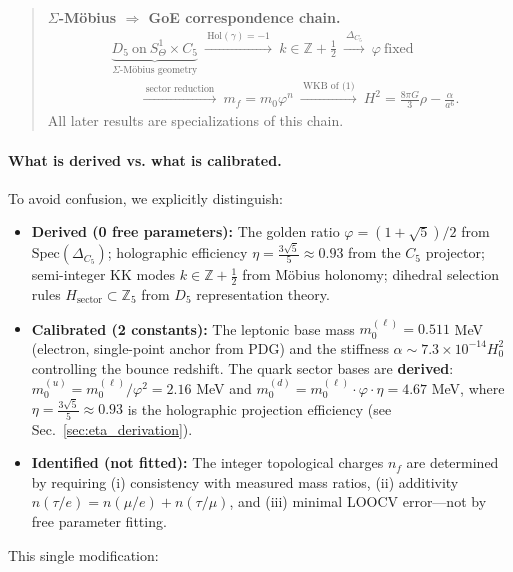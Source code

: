 \documentclass[12pt]{article}
\theoremstyle{definition}
\theoremstyle{plain}
\begin{document}
\begin{quote}
\textbf{$\Sigma$-M\"obius $\Rightarrow$ GoE correspondence chain.}
\begin{align*}
&\underbrace{D_5\ \text{on}\ S^1_\Theta \times C_5}_{\text{$\Sigma$-M\"obius geometry}}
\ \xrightarrow{\ \text{Hol}(\gamma)=-1\ }\ 
k \in \mathbb{Z}+\tfrac{1}{2}
\ \xrightarrow{\ \Delta_{C_5}\ }\ 
\varphi\ \text{fixed} \\
&\qquad \xrightarrow{\ \text{sector reduction}\ }\ 
m_f=m_0\varphi^n
\ \xrightarrow{\ \text{WKB of (1)}\ }\ 
H^2=\tfrac{8\pi G}{3}\rho-\tfrac{\alpha}{a^6}.
\end{align*}
All later results are specializations of this chain.
\end{quote}

\paragraph{What is derived vs. what is calibrated.}
To avoid confusion, we explicitly distinguish:
\begin{itemize}
\item \textbf{Derived (0 free parameters):} The golden ratio $\varphi = (1+\sqrt{5})/2$ from $\mathrm{Spec}(\Delta_{C_5})$; holographic efficiency $\eta = \frac{3\sqrt{5}}{5} \approx 0.93$ from the $C_5$ projector; semi-integer KK modes $k \in \mathbb{Z}+\tfrac{1}{2}$ from M\"obius holonomy; dihedral selection rules $H_{\text{sector}} \subset \mathbb{Z}_5$ from $D_5$ representation theory.

\item \textbf{Calibrated (2 constants):} The leptonic base mass $m_0^{(\ell)} = 0.511$ MeV (electron, single-point anchor from PDG) and the stiffness $\alpha \sim 7.3 \times 10^{-14} H_0^2$ controlling the bounce redshift. The quark sector bases are \textbf{derived}: $m_0^{(u)} = m_0^{(\ell)}/\varphi^2 = 2.16$ MeV and $m_0^{(d)} = m_0^{(\ell)} \cdot \varphi \cdot \eta = 4.67$ MeV, where $\eta = \frac{3\sqrt{5}}{5} \approx 0.93$ is the holographic projection efficiency (see Sec.~\ref{sec:eta_derivation}).

\item \textbf{Identified (not fitted):} The integer topological charges $n_f$ are determined by requiring (i) consistency with measured mass ratios, (ii) additivity $n(\tau/e) = n(\mu/e) + n(\tau/\mu)$, and (iii) minimal LOOCV error—not by free parameter fitting.
\end{itemize}

This single modification:
\end{document}
